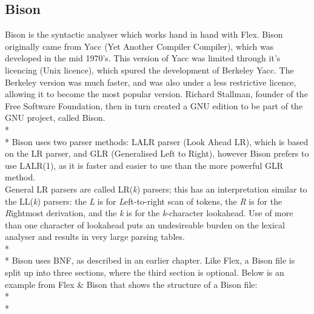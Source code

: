 \documentclass[12pt]{report}
\begin{document}
\subsection{Bison}\label{subsec:bison}
Bison is the syntactic analyser which works hand in hand with Flex.  Bison originally came from Yacc (Yet Another Compiler Compiler), which was developed in the mid 1970's.  This version of Yacc was limited through it's licencing (Unix licence), which spured the development of Berkeley Yacc.  The Berkeley version was much faster, and was also under a less restrictive licence, allowing it to become the most popular version.  Richard Stallman, founder of the Free Software Foundation, then in turn created a GNU edition to be part of the GNU project, called Bison.\\*
\\*
Bison uses two parser methods: LALR parser (Look Ahead LR), which is based on the LR parser, and GLR (Generalised Left to Right), however Bison prefers to use LALR(1), as it is faster and easier to use than the more powerful GLR method.
\\
General LR parsers are called LR(\textit{k}) parsers; this has an interpretation similar to the LL(\textit{k}) parsers: the \textit{L} is for \textit{L}eft-to-right scan of tokens, the \textit{R} is for the \textit{R}ightmost derivation, and the \textit{k} is for the \textit{k}-character lookahead.  Use of more than one character of lookahead puts an undesireable burden on the lexical analyser and results in very large parsing tables. \citep{compilerconstruction92}
\\*
\\*
Bison uses BNF, as described in an earlier chapter.  Like Flex, a Bison file is split up into three sections, where the third section is optional.  Below is an example from Flex \& Bison that shows the structure of a Bison file:\\*
\\*
\end{document}
